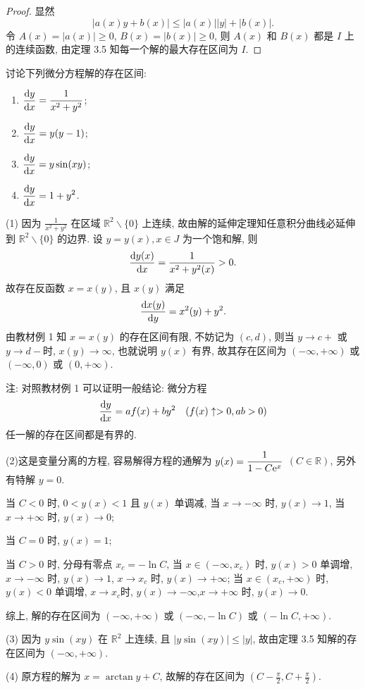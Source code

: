 \begin{proof}
  显然
  \[|a(x)y+b(x)|\leq|a(x)||y|+|b(x)|.\]
  令 $A(x)=|a(x)|\geq 0$, $B(x)=|b(x)|\geq 0$,
  则 $A(x)$ 和 $B(x)$ 都是 $I$ 上的连续函数, 由定理 3.5 知每一个解的最大存在区间为 $I$.
\end{proof}



\begin{exercise}
  讨论下列微分方程解的存在区间:
  \begin{enumerate}[(1)]
  \item $\displaystyle\frac{\mathop{}\!\mathrm{d} y}{\mathop{}\!\mathrm{d} x}=\frac{1}{x^2+y^2}$;
  \item $\displaystyle\frac{\mathop{}\!\mathrm{d} y}{\mathop{}\!\mathrm{d} x}=y(y-1)$;
  \item $\displaystyle\frac{\mathop{}\!\mathrm{d} y}{\mathop{}\!\mathrm{d} x}=y\sin(xy)$;
  \item $\displaystyle\frac{\mathop{}\!\mathrm{d} y}{\mathop{}\!\mathrm{d} x}=1+y^2$.
  \end{enumerate}
\end{exercise}

\begin{solution}
  (1) 因为 $\frac{1}{x^2+y^2}$ 在区域 $\mathbb{R}^2\backslash\{0\}$ 上连续,
  故由解的延伸定理知任意积分曲线必延伸到 $\mathbb{R}^2\backslash\{0\}$ 的边界.
  设 $y=y(x),x\in J$ 为一个饱和解, 则
  \[\frac{\mathop{}\!\mathrm{d} y(x)}{\mathop{}\!\mathrm{d} x}=\frac{1}{x^2+y^2(x)}>0.\]
  故存在反函数 $x=x(y)$, 且 $x(y)$ 满足
  \[\frac{\mathop{}\!\mathrm{d} x(y)}{\mathop{}\!\mathrm{d} y}=x^2(y)+y^2.\]
  由教材例 1 知 $x=x(y)$ 的存在区间有限, 不妨记为 $(c,d)$,
  则当 $y\to c+$ 或 $y\to d-$时, $x(y)\to\infty$, 也就说明 $y(x)$ 有界,
  故其存在区间为 $(-\infty,+\infty)$ 或 $(-\infty,0)$ 或 $(0,+\infty)$.

  注: 对照教材例 1 可以证明一般结论: 微分方程
  \[\frac{\mathop{}\!\mathrm{d} y}{\mathop{}\!\mathrm{d} x}=af(x)+by^2\quad (f(x)\uparrow>0,ab>0)\]
  任一解的存在区间都是有界的.

  (2)这是变量分离的方程, 容易解得方程的通解为
  $\displaystyle y(x)=\frac{1}{1-C\mathrm{e}^x}$ $(C\in\mathbb{R})$, 另外有特解 $y=0$.

  当 $C<0$ 时, $0<y(x)<1$ 且 $y(x)$ 单调减,
  当 $x\to-\infty$ 时, $y(x)\to 1$, 当 $x\to+\infty$ 时, $y(x)\to 0$;

  当 $C=0$ 时, $y(x)=1$;

  当 $C>0$ 时, 分母有零点 $x_c=-\ln C$, 当 $x\in(-\infty,x_c)$ 时, $y(x)>0$ 单调增,
  $x\to-\infty$ 时, $y(x)\to1$, $x\to x_c$ 时, $y(x)\to+\infty$;
  当 $x\in(x_c,+\infty)$ 时, $y(x)<0$ 单调增, $x\to x_c$时,
  $y(x)\to-\infty$,$x\to+\infty$ 时, $y(x)\to0$.

  综上, 解的存在区间为 $(-\infty,+\infty)$ 或 $(-\infty,-\ln C)$ 或 $(-\ln C,+\infty)$.

  (3) 因为 $y\sin(xy)$ 在 $\mathbb{R}^2$ 上连续,
  且 $|y\sin(xy)|\leq|y|$, 故由定理 3.5 知解的存在区间为 $(-\infty,+\infty)$.

  (4) 原方程的解为 $x=\arctan y+C$, 故解的存在区间为 $(C-\frac{\pi}{2},C+\frac{\pi}{2})$.
\end{solution}



